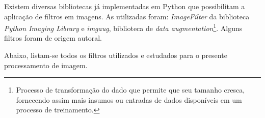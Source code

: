 \begin{figure}[H]
\begin{subfigure}{.5\textwidth}
    \label{fig:image-with-filter}
  \end{subfigure}
  \label{fig:side-process-images}
\end{figure}

Existem diversas bibliotecas já implementadas em Python que possibilitam a aplicação de filtros em imagens. As utilizadas foram: \textit{ImageFilter} da biblioteca \textit{Python Imaging Library} e \textit{imgaug}, biblioteca de \textit{data augmentation}\footnote{
  Processo de transformação do dado que permite que seu tamanho cresca, fornecendo assim mais insumos ou entradas de dados disponíveis em um processo de treinamento.
}. Alguns filtros foram de origem autoral.

Abaixo, listam-se todos os filtros utilizados e estudados para o presente processamento de imagem.

